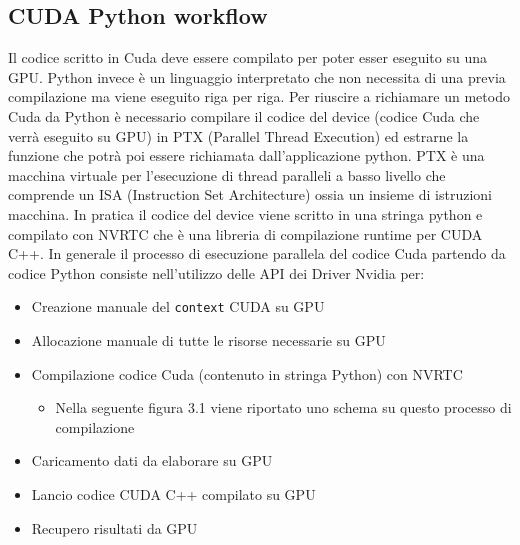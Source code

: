 \documentclass[12pt,a4paper]{report}
\begin{document}
\subsection{CUDA Python workflow}
Il codice scritto in Cuda deve essere compilato per poter esser eseguito su una GPU. Python invece è un linguaggio interpretato che non necessita di una previa compilazione ma viene eseguito riga per riga. Per riuscire a richiamare un metodo Cuda da Python è necessario compilare il codice del device (codice Cuda che verrà eseguito su GPU) in PTX (Parallel Thread Execution) ed estrarne la funzione che potrà poi essere richiamata dall'applicazione python. PTX è una macchina virtuale per l'esecuzione di thread paralleli a basso livello che comprende un ISA (Instruction Set Architecture) ossia un insieme di istruzioni macchina. \newline
In pratica il codice del device viene scritto in una stringa python e compilato con NVRTC che è una libreria di compilazione runtime per CUDA C++. \newline
In generale il processo di esecuzione parallela del codice Cuda partendo da codice Python consiste nell'utilizzo delle API dei Driver Nvidia per:
\begin{itemize}
    \item Creazione manuale del \verb|context| CUDA su GPU
    \item Allocazione manuale di tutte le risorse necessarie su GPU
    \item Compilazione codice Cuda (contenuto in stringa Python) con NVRTC
    \begin{itemize}
        \item Nella seguente figura 3.1 viene riportato uno schema su questo processo di compilazione
    \end{itemize}
        \begin{figure}[H]
        \centering
        \begin{floatrow}[1]
        \end{floatrow}
        \end{figure} 
    \item Caricamento dati da elaborare su GPU
    \item Lancio codice CUDA C++ compilato su GPU
    \item Recupero risultati da GPU 
\end{itemize} \newpage
\end{document}
